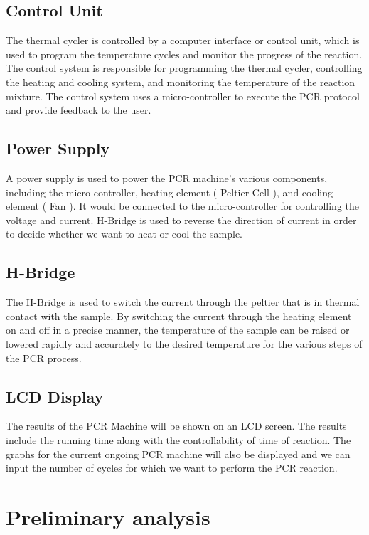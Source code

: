 \documentclass[12pt]{article}
\begin{document}
\subsection{Control Unit}
The thermal cycler is controlled by a computer interface or control unit, which is used to program the temperature cycles and monitor the progress of the reaction. The control system is responsible for programming the thermal cycler, controlling the heating and cooling system, and monitoring the temperature of the reaction mixture. The control system uses a micro-controller to execute the PCR protocol and provide feedback to the user.

\subsection{Power Supply}
A power supply is used to power the PCR machine's various components, including the micro-controller, heating element ( Peltier Cell ), and cooling element ( Fan ). It would be connected to the micro-controller for controlling the voltage and current. H-Bridge is used to reverse the direction of current in order to decide whether we want to heat or cool the sample.

\subsection{H-Bridge}
The H-Bridge is used to switch the current through the peltier that is in thermal contact with the sample. By switching the current through the heating element on and off in a precise manner, the temperature of the sample can be raised or lowered rapidly and accurately to the desired temperature for the various steps of the PCR process.


\subsection{LCD Display}
The results of the PCR Machine will be shown on an LCD screen. The results include the running time along with the controllability of time of reaction. The graphs for the current ongoing PCR machine will also be displayed and we can input the number of cycles for which we want to perform the PCR reaction.


\maketitle


\section{ Preliminary analysis }
\end{document}

